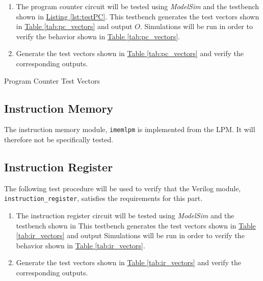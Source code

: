 \begin{enumerate}
    \item The program counter circuit will be tested using \emph{ModelSim} and the testbench shown in \hyperref[lst:testPC]{Listing \ref*{lst:testPC}}.
    This testbench generates the test vectors shown in \hyperref[tab:pc_vectors]{Table \ref*{tab:pc_vectors}} and output $O$.
    Simulations will be run in order to verify the behavior shown in \hyperref[tab:pc_vectors]{Table \ref*{tab:pc_vectors}}.
    \item Generate the test vectors shown in \hyperref[tab:pc_vectors]{Table \ref*{tab:pc_vectors}}
    and verify the corresponding outputs.
\end{enumerate}

\begin{table}[htbp]
    \centering
    \caption{Program Counter Test Vectors\label{tab:pc_vectors}}
\end{table}


\subsection{Instruction Memory} %
\label{sub:instruction_memory}

The instruction memory module, \verb|imemlpm| is implemented from the LPM.
It will therefore not be specifically tested.


\subsection{Instruction Register} %
\label{sub:instruction_register_pro}

The following test procedure will be used to verify that the Verilog module, \verb|instruction_register|, satisfies the requirements for this part.

\begin{enumerate}
    \item The instruction register circuit will be tested using \emph{ModelSim} and the testbench shown in %
    This testbench generates the test vectors shown in \hyperref[tab:ir_vectors]{Table \ref*{tab:ir_vectors}} and output %
    Simulations will be run in order to verify the behavior shown in \hyperref[tab:ir_vectors]{Table \ref*{tab:ir_vectors}}.
    \item Generate the test vectors shown in \hyperref[tab:ir_vectors]{Table \ref*{tab:ir_vectors}}
    and verify the corresponding outputs.
\end{enumerate}

